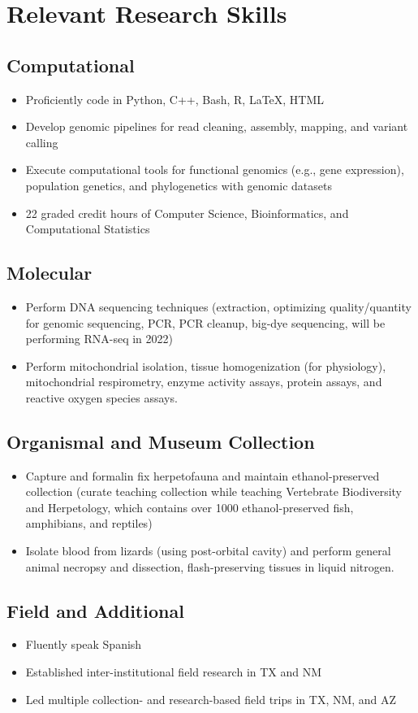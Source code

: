 \documentclass[11pt,a4paper,sans]{moderncv}        %
\begin{document}
\section{Relevant Research Skills}
\subsection{Computational}
\begin{itemize}
	\item{Proficiently code in Python, C++, Bash, R, LaTeX, HTML}
	\item{Develop genomic pipelines for read cleaning, assembly, mapping, and variant calling}
	\item{Execute computational tools for functional genomics (e.g., gene expression), population genetics, and phylogenetics with genomic datasets}
	\item{22 graded credit hours of Computer Science, Bioinformatics, and Computational Statistics}
\end{itemize}
\subsection{Molecular}
\begin{itemize}
	\item{Perform DNA sequencing techniques (extraction, optimizing quality/quantity for genomic sequencing, PCR, PCR cleanup, big-dye sequencing, will be performing RNA-seq in 2022)}
	\item{Perform mitochondrial isolation, tissue homogenization (for physiology), mitochondrial respirometry, enzyme activity assays, protein assays, and reactive oxygen species assays.}
\end{itemize}
\subsection{Organismal and Museum Collection}
\begin{itemize}
	\item{Capture and formalin fix herpetofauna and maintain ethanol-preserved collection (curate teaching collection while teaching Vertebrate Biodiversity and Herpetology, which contains over 1000 ethanol-preserved fish, amphibians, and reptiles)}
	\item{Isolate blood from lizards (using post-orbital cavity) and perform general animal necropsy and dissection, flash-preserving tissues in liquid nitrogen.}
\end{itemize}
\subsection{Field and Additional}
\begin{itemize}
	\item{Fluently speak Spanish}
	\item{Established inter-institutional field research in TX and NM}
	\item{Led multiple collection- and research-based field trips in TX, NM, and AZ}
\end{itemize}
\end{document}
